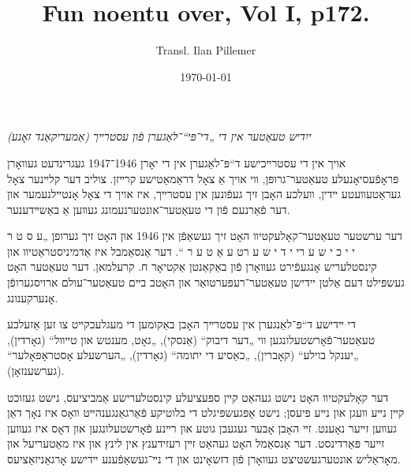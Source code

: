 \documentclass{article}
\begin{document}
\renewcommand{\abstractname}{\vspace{-\baselineskip}}
\title{Fun noentu over, Vol I, p172.}
\author{Transl. Ilan Pillemer}
\date{\today}

\maketitle



\begin{pairs}

\begin{Rightside}

\begin{RTL}
\begin{hebrew}
\beginnumbering
\autopar
\emph{
ייִדיש טעאַטער אין די „די־פּי“־לאַגערן פֿון עסטרײך (אַמעריקאַנד זאָנע)
}
\newline

אויך אין די עסטרײכישע ד“פּ־לאַגערן אין די יאָרן 1946־1947
געגרינדעט געװאָרן פּראָפֿעסיאָנעלע טעאַטער־גרופּן, װי אויך אַ צאָל דראַמאַטישע קרײזן.
 צוליב דער קלײנער צאָל געראַטעװעטע ײדין, װעלכע האָבן זיך געפֿונען אין עסטרײך, איז אויך די צאָל אָנטײלנעמער און
 דער פֿאַרנעם פֿון די טעאַטער־אונטערנעמונג געװען אַ באַשײדענער.

דער ערשטער טעאַטער־קאָלעקטיװ האָט זיך געשאַפֿן אין 1946 און האָט זיך גערופן „ע ס ט ר י י כ י ש ע ר\space\space  י י ד י ש ע ר\space\space  ט ע אַ ט ע ר “.
דער אַנסאַמבל איז אַדמיניסטראַטיװ און קינסטלעריש אָנגעפֿירט געװאָרן פֿון באַקאַנטן אַקטיאָר ח. קרעלמאן.
דער טעאַטער האָט געשפּילט דעם אַלטן יידישן טעאַטער־רעפּערטואַר און האָטב בײם  
 טעאַטער־עולם ארויסגערופֿן אָנערקענונג.


די ײדישע ד“פּ־לאַנגערן אין עסטרײך האָבן באַקומען די מעגלעכקײט צו זען אַזעלכע טעאַטער־פֿאָרשטעלונגען װי „דער דיבוק“ (אַנסקי),
„גאָט, מענטש און טײװל“ (גאָרדין), „יענקל בוילע“ (קאָברין), „כאַסיע די יתומה“ (גאָרדין),
„הערשעלע אָסטראָפּאָלער“ (גערשענזאָן).

דער קאָלעקטיװ האָט נישט געהאַט קײן ספּעציעלע קינסטלערישע אַמביציעס, נישט געזוכט קײן נײע װעגן און נײע פּיעסן;
נישט אָפּגעשפּיגלט די בלוטיקע פֿאַרגאַנגענהײט װאָס איז נאָך דאַן געװען זײער נאָענט.
זײ האָבן אָבער געגעבן גוטע און רײנע פֿאָרשטעלונגען און דאָס איז געװען זײער פּאַרדינסט.
דער אַנסאַמל האָט געהאַט זײן רעזידענץ אין לינץ און איז מאַטעריעל
און מאָראַליש אונטערגעשטיצט געװאָרן פֿון דזשאָינט און די
נײ־געשאַפֿענע ײדישע אָרגאַניזאַציעס.

\endnumbering
\end{hebrew}
\end{RTL}
\end{Rightside}



\end{pairs}
\end{document}
